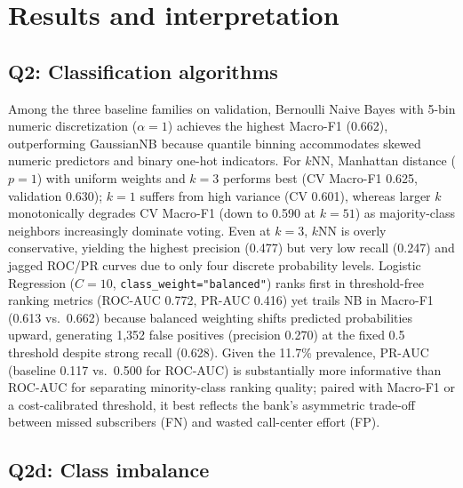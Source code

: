 \section{Results and interpretation}
\label{sec:results}

\subsection{Q2: Classification algorithms}

Among the three baseline families on validation, Bernoulli Naive Bayes with 5-bin numeric discretization ($\alpha = 1$) achieves the highest Macro-F1 (0.662), outperforming GaussianNB because quantile binning accommodates skewed numeric predictors and binary one-hot indicators. For $k$NN, Manhattan distance ($p = 1$) with uniform weights and $k = 3$ performs best (CV Macro-F1 0.625, validation 0.630); $k = 1$ suffers from high variance (CV 0.601), whereas larger $k$ monotonically degrades CV Macro-F1 (down to 0.590 at $k = 51$) as majority-class neighbors increasingly dominate voting. Even at $k = 3$, $k$NN is overly conservative, yielding the highest precision (0.477) but very low recall (0.247) and jagged ROC/PR curves due to only four discrete probability levels. Logistic Regression ($C = 10$, \texttt{class\_weight="balanced"}) ranks first in threshold-free ranking metrics (ROC-AUC 0.772, PR-AUC 0.416) yet trails NB in Macro-F1 (0.613 vs.\ 0.662) because balanced weighting shifts predicted probabilities upward, generating 1,352 false positives (precision 0.270) at the fixed 0.5 threshold despite strong recall (0.628). Given the 11.7\% prevalence, PR-AUC (baseline 0.117 vs.\ 0.500 for ROC-AUC) is substantially more informative than ROC-AUC for separating minority-class ranking quality; paired with Macro-F1 or a cost-calibrated threshold, it best reflects the bank's asymmetric trade-off between missed subscribers (FN) and wasted call-center effort (FP).

\subsection{Q2d: Class imbalance}

